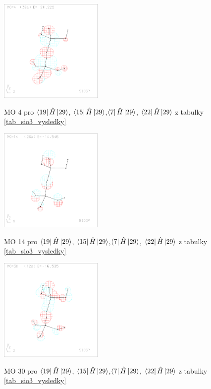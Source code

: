 \documentclass[
  digital, %
  table,   %
  lof,     %
  lot,     %
]{fithesis3}
\begin{document}
\begin{figure}[h]
\caption{MO 4 pro $\bra{19}{\hat{H}}\ket{29}$, $\bra{15}{\hat{H}}\ket{29}$,$\bra{7}{\hat{H}}\ket{29}$, $\bra{22}{\hat{H}}\ket{29}$ z tabulky \ref{tab_sio3_vysledky}}
  \center
  \includegraphics[width=5cm]{sio3p_obrazky/mo_4.eps}
  \label{obr_sio3_MO_4}
  \end{figure}

\begin{figure}[h]
\caption{MO 14 pro $\bra{19}{\hat{H}}\ket{29}$, $\bra{15}{\hat{H}}\ket{29}$,$\bra{7}{\hat{H}}\ket{29}$, $\bra{22}{\hat{H}}\ket{29}$ z tabulky \ref{tab_sio3_vysledky}}
  \center
  \includegraphics[width=5cm]{sio3p_obrazky/mo_14.eps}
  \label{obr_sio3_MO_14}
  \end{figure}

\begin{figure}[h]
\caption{MO 30 pro $\bra{19}{\hat{H}}\ket{29}$, $\bra{15}{\hat{H}}\ket{29}$,$\bra{7}{\hat{H}}\ket{29}$, $\bra{22}{\hat{H}}\ket{29}$ z tabulky \ref{tab_sio3_vysledky}}
  \center
  \includegraphics[width=5cm]{sio3p_obrazky/mo_30.eps}
  \label{obr_sio3_MO_30}
  \end{figure}
\end{document}
